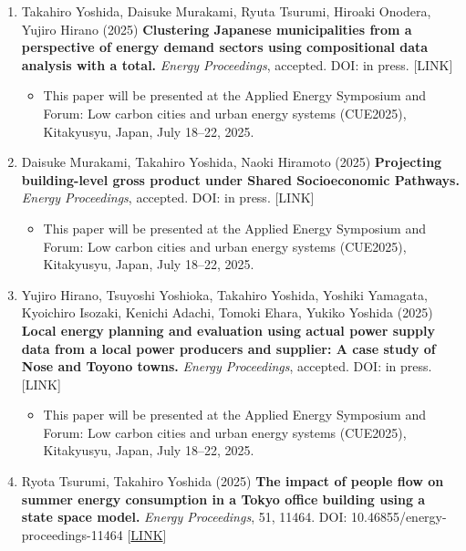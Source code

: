 \documentclass[
]{book}
\providecommand{\tightlist}{%
  \setlength{\itemsep}{0pt}\setlength{\parskip}{0pt}}
\begin{document}
\begin{enumerate}
\def\labelenumi{\arabic{enumi}.}
\tightlist
\item
  Takahiro Yoshida, Daisuke Murakami, Ryuta Tsurumi, Hiroaki Onodera, Yujiro Hirano (2025)
  \textbf{Clustering Japanese municipalities from a perspective of energy demand sectors using compositional data analysis with a total.}
  \emph{Energy Proceedings}, accepted.
  DOI: in press. {[}LINK{]}

  \begin{itemize}
  \tightlist
  \item
    This paper will be presented at the Applied Energy Symposium and Forum: Low carbon cities and urban energy systems (CUE2025), Kitakyusyu, Japan, July 18--22, 2025.
  \end{itemize}
\item
  Daisuke Murakami, Takahiro Yoshida, Naoki Hiramoto (2025)
  \textbf{Projecting building-level gross product under Shared Socioeconomic Pathways.}
  \emph{Energy Proceedings}, accepted.
  DOI: in press. {[}LINK{]}

  \begin{itemize}
  \tightlist
  \item
    This paper will be presented at the Applied Energy Symposium and Forum: Low carbon cities and urban energy systems (CUE2025), Kitakyusyu, Japan, July 18--22, 2025.
  \end{itemize}
\item
  Yujiro Hirano, Tsuyoshi Yoshioka, Takahiro Yoshida, Yoshiki Yamagata, Kyoichiro Isozaki, Kenichi Adachi, Tomoki Ehara, Yukiko Yoshida (2025)
  \textbf{Local energy planning and evaluation using actual power supply data from a local power producers and supplier: A case study of Nose and Toyono towns.}
  \emph{Energy Proceedings}, accepted.
  DOI: in press. {[}LINK{]}

  \begin{itemize}
  \tightlist
  \item
    This paper will be presented at the Applied Energy Symposium and Forum: Low carbon cities and urban energy systems (CUE2025), Kitakyusyu, Japan, July 18--22, 2025.
  \end{itemize}
\item
  Ryota Tsurumi, Takahiro Yoshida (2025)
  \textbf{The impact of people flow on summer energy consumption in a Tokyo office building using a state space model.}
  \emph{Energy Proceedings}, 51, 11464.
  DOI: 10.46855/energy-proceedings-11464 {[}\href{https://doi.org/10.46855/energy-proceedings-11464}{LINK}{]}


\end{enumerate}
\end{document}
